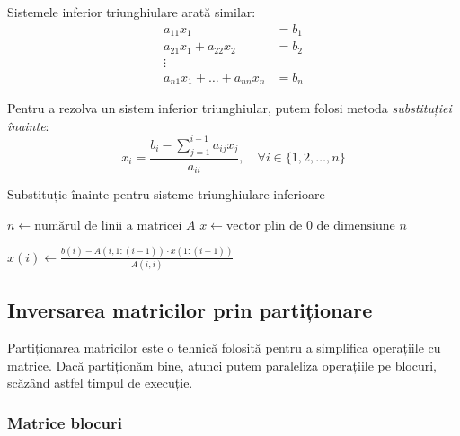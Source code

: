 \documentclass{exam}
\newcommand{\octavescript}[2]{
	
}
\begin{document}
Sistemele inferior triunghiulare arată similar:
\begin{align*}
	a_{11} x_1                       & = b_1 \\
	a_{21} x_1 + a_{22} x_2          & = b_2 \\
	\vdots                                   \\
	a_{n1} x_1 + \ldots + a_{nn} x_n & = b_n
\end{align*}

Pentru a rezolva un sistem inferior triunghiular, putem folosi metoda
\textit{substituției înainte}:
\begin{equation}
	x_i = \frac{b_i - \sum_{j = 1}^{i - 1}{a_{ij} x_j}}{a_{ii}}, \quad \forall i \in \{1, 2, \ldots, n\}
\end{equation}


\begin{algorithm}
	\caption{Substituție înainte pentru sisteme triunghiulare inferioare}
	\begin{algorithmic}[1]
		\State \( n \gets \text{numărul de linii a matricei } A \)
		\State \( x \gets \text{vector plin de 0 de dimensiune } n \)

		\State \( x(i) \gets \frac{b(i) - A(i, 1:(i-1)) \cdot x(1:(i-1))}{A(i, i)} \)
		\EndFor

	\end{algorithmic}
\end{algorithm}

\subsection{Inversarea matricilor prin partiționare}

Partiționarea matricilor este o tehnică folosită pentru a simplifica operațiile
cu matrice. Dacă partiționăm bine, atunci putem paraleliza operațiile pe blocuri,
scăzând astfel timpul de execuție.

\subsubsection{Matrice blocuri}
\end{document}
